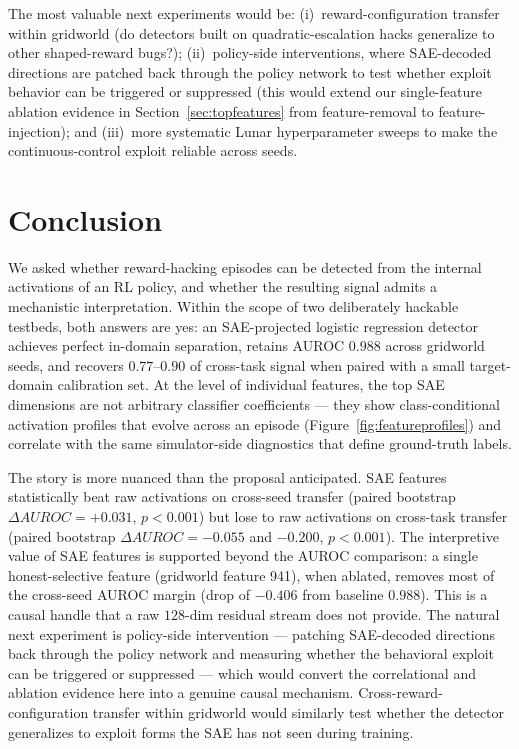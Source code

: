 \documentclass[11pt]{article}
\newcommand{\auroc}{AUROC}
\begin{document}
The most valuable next experiments would be: (i)~reward-configuration transfer within gridworld (do detectors built on quadratic-escalation hacks generalize to other shaped-reward bugs?); (ii)~policy-side interventions, where SAE-decoded directions are patched back through the policy network to test whether exploit behavior can be triggered or suppressed (this would extend our single-feature ablation evidence in Section~\ref{sec:topfeatures} from feature-removal to feature-injection); and (iii)~more systematic Lunar hyperparameter sweeps to make the continuous-control exploit reliable across seeds.

\section{Conclusion}

We asked whether reward-hacking episodes can be detected from the internal activations of an RL policy, and whether the resulting signal admits a mechanistic interpretation. Within the scope of two deliberately hackable testbeds, both answers are yes: an SAE-projected logistic regression detector achieves perfect in-domain separation, retains \auroc{} $0.988$ across gridworld seeds, and recovers $0.77$--$0.90$ of cross-task signal when paired with a small target-domain calibration set. At the level of individual features, the top SAE dimensions are not arbitrary classifier coefficients --- they show class-conditional activation profiles that evolve across an episode (Figure~\ref{fig:featureprofiles}) and correlate with the same simulator-side diagnostics that define ground-truth labels.

The story is more nuanced than the proposal anticipated. SAE features statistically beat raw activations on cross-seed transfer (paired bootstrap $\Delta\auroc{}=+0.031$, $p<0.001$) but lose to raw activations on cross-task transfer (paired bootstrap $\Delta\auroc{}=-0.055$ and $-0.200$, $p<0.001$). The interpretive value of SAE features is supported beyond the AUROC comparison: a single honest-selective feature (gridworld feature 941), when ablated, removes most of the cross-seed AUROC margin (drop of $-0.406$ from baseline $0.988$). This is a causal handle that a raw $128$-dim residual stream does not provide. The natural next experiment is policy-side intervention --- patching SAE-decoded directions back through the policy network and measuring whether the behavioral exploit can be triggered or suppressed --- which would convert the correlational and ablation evidence here into a genuine causal mechanism. Cross-reward-configuration transfer within gridworld would similarly test whether the detector generalizes to exploit forms the SAE has not seen during training.
\end{document}
